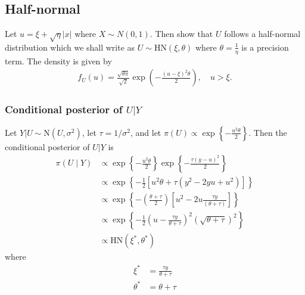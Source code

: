 
\subsection*{Half-normal}\label{s:hn}
Let $u = \xi + \sqrt{\eta} |x|$ where $X \sim N(0, 1)$.
Then \citet{Wiper2008} show that $U$ follows a half-normal distribution which we shall write as $U \sim \mbox{HN}(\xi, \theta )$ where $\theta = \displaystyle \frac{ 1 }{ \eta }$ is a precision term.
The density is given by 
\begin{align}
  f_U(u) = \frac{ \sqrt{\theta \pi} }{ \sqrt{2} } \exp \left( - \frac{ (u-\xi)^2 \theta }{ 2 } \right), \quad u > \xi.
\end{align}

\subsubsection*{Conditional posterior of $U | Y$}\label{s:condu}
Let $Y | U \sim \mbox{N}(U, \sigma^2)$, let $\tau = 1 / \sigma^2$, and let $\pi(U) \propto \exp \left\{ -\frac{ u^2 \theta }{ 2 } \right\}$. 
Then the conditional posterior of $U | Y$ is 
\begin{align}
  \pi (U \mid Y) & \propto \exp \left\{ -\frac{ u^2 \theta }{ 2 } \right\} \exp \left\{ - \frac{ \tau (y - u)^2 }{ 2 } \right\} \nonumber \\
    & \propto \exp \left\{ -\frac{ 1 }{ 2 } \left[ u^2 \theta + \tau (y^2 - 2yu + u^2) \right] \right\} \nonumber \\
    & \propto \exp \left\{ -\left( \frac{ \theta + \tau }{ 2 } \right) \left[ u^2 - 2u \frac{ \tau y }{ (\theta + \tau )} \right] \right\} \nonumber \\
    & \propto \exp \left\{ - \frac{ 1 }{ 2 }\left( u - \frac{ \tau y }{ \theta + \tau } \right)^2 \left( \sqrt{ \theta + \tau } \right)^2 \right\} \nonumber\\
    & \propto \mbox{HN}(\xi^*, \theta^*) \label{eq:condu}
\end{align}
where 
\begin{align*}
  \xi^* &= \frac{ \tau y }{ \theta + \tau }\\
  \theta^* &= \theta + \tau
\end{align*}

